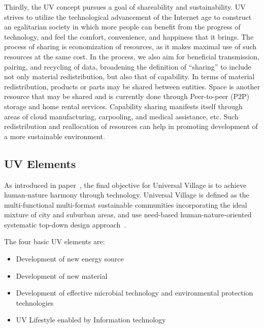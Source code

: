 \documentclass[letterpaper, twocolumn, 10pt, conference]{IEEEtran}
\begin{document}
Thirdly, the UV concept pursues a goal of shareability and sustainability. UV strives to utilize the technological advancement of the Internet age to construct an egalitarian society in which more people can benefit from the progress of technology, and feel the comfort, convenience, and happiness that it brings. The process of sharing is economization of resources, as it makes maximal use of such resources at the same cost.  In the process, we also aim for beneficial transmission, pairing, and recycling of data, broadening the definition of \enquote{sharing} to include not only material redistribution, but also that of capability. In terms of material redistribution, products or parts may be shared between entities. Space is another resource that may be shared and is currently done through Peer-to-peer (P2P) storage and home rental services. Capability sharing manifests itself through areas of cloud manufacturing, carpooling, and medical assistance, etc. Such redistribution and reallocation of resources can help in promoting development of a more sustainable environment.

\subsection{UV Elements}
\label{ssec:UVElements}

As introduced in paper~\cite{mit-uv2013}, the final objective for Universal Village is to achieve human-nature harmony through technology. Universal Village is defined as the multi-functional multi-format sustainable communities incorporating the ideal mixture of city and suburban areas, and use need-based human-nature-oriented systematic top-down design approach~\cite{mit-uv2013}.


The four basic UV elements are:
\begin{itemize}
\item    Development of new energy source
\item    Development of new material
\item    Development of effective microbial technology and environmental protection technologies
\item    UV Lifestyle enabled by Information technology
\end{itemize}

\end{document}
